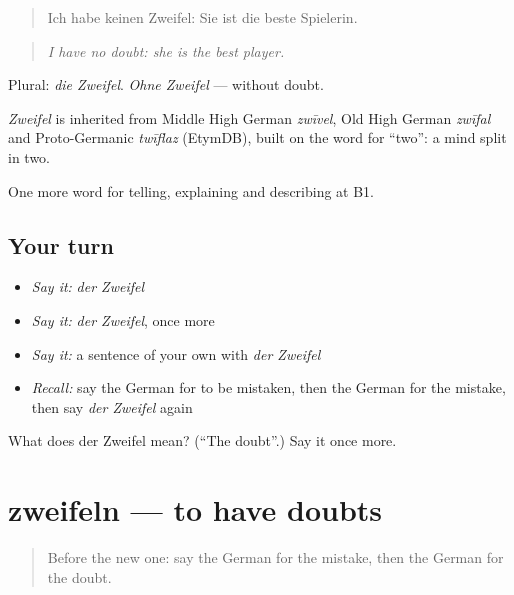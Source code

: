 \begin{quote}
Ich habe keinen Zweifel: Sie ist die beste Spielerin.
\end{quote}

\begin{quote}
\emph{I have no doubt: she is the best player.}
\end{quote}

Plural: \emph{die Zweifel}. \emph{Ohne Zweifel} — without doubt.

\begin{cousinweb}
\emph{Zweifel} is inherited from Middle High German \emph{zwīvel}, Old High German \emph{zwīfal} and Proto-Germanic \emph{twīflaz} (EtymDB), built on the word for \textquotedblleft{}two\textquotedblright{}: a mind split in two.
\end{cousinweb}

\begin{grammarlens}[title={What you've built}]
One more word for telling, explaining and describing at B1.
\end{grammarlens}

\subsection*{Your turn}
\begin{itemize}
\raggedright
  \item \emph{Say it:} \emph{der Zweifel}
  \item \emph{Say it:} \emph{der Zweifel}, once more
  \item \emph{Say it:} a sentence of your own with \emph{der Zweifel}
  \item \emph{Recall:} say the German for to be mistaken, then the German for the mistake, then say \emph{der Zweifel} again
\end{itemize}

\begin{tcolorbox}[breakable,colback=teal!4,colframe=teal!35!black,title={Before you move on}]
What does der Zweifel mean? (\textquotedblleft{}The doubt\textquotedblright{}.) Say it once more.
\end{tcolorbox}
\section[zweifeln]{zweifeln — to have doubts}

\label{lesson:GE-C337-zweifeln}



\begin{quote}
Before the new one: say the German for the mistake, then the German for the doubt.
\end{quote}

